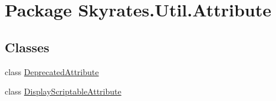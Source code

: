 \hypertarget{namespace_skyrates_1_1_util_1_1_attribute}{\section{Package Skyrates.\-Util.\-Attribute}
\label{namespace_skyrates_1_1_util_1_1_attribute}
}
\subsection*{Classes}
\begin{DoxyCompactItemize}
\item 
class \hyperlink{class_skyrates_1_1_util_1_1_attribute_1_1_deprecated_attribute}{Deprecated\-Attribute}
\item 
class \hyperlink{class_skyrates_1_1_util_1_1_attribute_1_1_display_scriptable_attribute}{Display\-Scriptable\-Attribute}
\end{DoxyCompactItemize}
